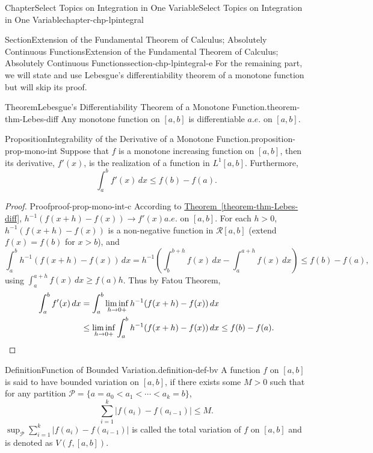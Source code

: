 \documentclass[oneside,10pt,]{book}
\newcommand{\xreffont}{\relax}
\numberwithin{equation}{section}
\newcommand{\qedhere}{\relax}
\newcommand{\cP}{\mathcal{P}}
\newcommand{\cR}{\mathcal{R}}
\newcommand{\amp}{&}
\begin{document}
\begin{chapterptx}{Chapter}{Select Topics on Integration in One Variable}{}{Select Topics on Integration in One Variable}{}{}{chapter-chp-lpintegral}
\begin{sectionptx}{Section}{Extension of the Fundamental Theorem of Calculus; Absolutely Continuous Functions}{}{Extension of the Fundamental Theorem of Calculus; Absolutely Continuous Functions}{}{}{section-chp-lpintegral-e}
For the remaining part, we will state and use Lebesgue's differentiability theorem of a monotone function but will skip its proof.%
\begin{theorem}{Theorem}{Lebesgue's Differentiability Theorem of a Monotone Function.}{}{theorem-thm-Lebes-diff}%
Any monotone function on \([a, b]\) is differentiable \(a.e.\) on \([a, b]\).%
\end{theorem}
\begin{proposition}{Proposition}{Integrability of the Derivative of a Monotone Function.}{}{proposition-prop-mono-int}%
Suppose that \(f\) is a monotone increasing function on \([a, b]\), then its derivative, \(f'(x)\), is the realization of a function in \(L^{1}[a, b]\). Furthermore,%
\begin{equation*}
\int_{a}^{b} f'(x)\,dx \le f(b)-f(a).
\end{equation*}
\end{proposition}
\begin{proof}{Proof}{}{proof-prop-mono-int-c}
According to \hyperref[theorem-thm-Lebes-diff]{Theorem~{\xreffont\ref{theorem-thm-Lebes-diff}}}, \(h^{-1}(f(x+h)-f(x))\to f'(x)\)\(a.e.\) on \([a, b]\). For each \(h > 0\), \(h^{-1}(f(x+h)-f(x)) \) is a non-negative function in \(\cR[a, b]\) (extend \(f(x)=f(b)\) for \(x > b\)), and%
\begin{equation*}
\int_{a}^{b} h^{-1}(f(x+h)-f(x)) \, dx =h^{-1}\left( \int_{b}^{b+h} f(x)\,dx - \int_{a}^{a+h} f(x)\, dx\right)
\le f(b)- f(a),
\end{equation*}
using \(\int_{a}^{a+h} f(x)\, dx\ge f(a) h\). Thus by Fatou Theorem,%
\begin{align*}
\int_{a}^{b} f'(x)\, dx \amp = \int_{a}^{b} \liminf_{h\to 0+} h^{-1}(f(x+h)-f(x)) \, dx\\
\amp  \le
\liminf_{h\to 0+} \int_{a}^{b}  h^{-1}(f(x+h)-f(x)) \, dx \le f(b)-f(a).\qedhere
\end{align*}
\end{proof}
\begin{definition}{Definition}{Function of Bounded Variation.}{definition-def-bv}%
A function \(f\) on \([a, b]\) is said to have bounded variation on \([a, b]\), if there exists some \(M > 0\) such that for any partition \(\cP=\{a=a_{0} < a_{1} < \cdots < a_{k}=b\}\),%
\begin{equation*}
\sum_{i=1}^{k} |f(a_{i})-f(a_{i-1})| \le M.
\end{equation*}
\(\sup_{\cP} \sum_{i=1}^{k} |f(a_{i})-f(a_{i-1})|\) is called the total variation of \(f\) on \([a, b]\) and is denoted as \(V(f, [a, b])\).%

\end{definition}
\end{sectionptx}
\end{chapterptx}
\end{document}
